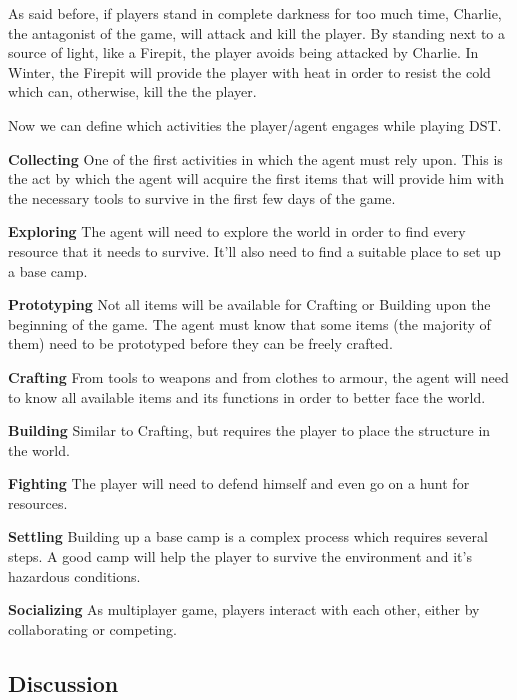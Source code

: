 As said before, if players stand in complete darkness for too much time, Charlie, the antagonist of the game, will attack and kill the player.
By standing next to a source of light, like a Firepit, the player avoids being attacked by Charlie.
In Winter, the Firepit will provide the player with heat in order to resist the cold which can, otherwise, kill the the player.

Now we can define which activities the player/agent engages while playing \ac{DST}.

\begin{description}
	\item \textbf{Collecting} One of the first activities in which the agent must rely upon.
This is the act by which the agent will acquire the first items that will provide him with the necessary tools to survive in the first few days of the game.
	\item \textbf{Exploring} The agent will need to explore the world in order to find every resource that it needs to survive.
	It'll also need to find a suitable place to set up a base camp.
	\item \textbf{Prototyping} Not all items will be available for Crafting or Building upon the beginning of the game.
	The agent must know that some items (the majority of them) need to be prototyped before they can be freely crafted.
	\item \textbf{Crafting} From tools to weapons and from clothes to armour, the agent will need to know all available items and its functions in order to better face the world.
	\item \textbf{Building} Similar to Crafting, but requires the player to place the structure in the world.
	\item \textbf{Fighting} The player will need to defend himself and even go on a hunt for resources.
	\item \textbf{Settling} Building up a base camp is a complex process which requires several steps.
	A good camp will help the player to survive the environment and it's hazardous conditions.
	\item \textbf{Socializing} As multiplayer game, players interact with each other, either by collaborating or competing.
\end{description}


\subsection{Discussion}